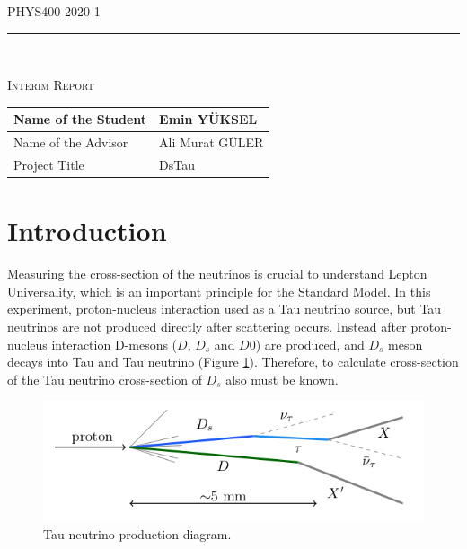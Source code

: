 \documentclass[12pt]{report}
\begin{document}
\begin{titlepage}
\centering
\vspace*{-4.0 cm}
\begin{center}    
\Large{PHYS400} \hfill \Large{2020-1}
\rule{\linewidth}{0.2 mm} \\[5.0 cm]
\end{center}
   	
\textsc{\Huge Interim Report}\\[5.0 cm]				
	
\begin{center}
\begin{tabular}{|l|l|}
\hline
\Large{Name of the Student} & Emin YÜKSEL
\\ \hline
\Large{Name of the Advisor} & Ali Murat GÜLER
\\ \hline
\Large{Project Title}       & DsTau 
\\ \hline
\end{tabular}
\end{center} 
\end{titlepage}

\tableofcontents
\pagebreak

\renewcommand{\thesection}{\arabic{section}}
\section{Introduction}

Measuring the cross-section of the neutrinos is crucial to understand Lepton Universality, which is an important principle for the Standard Model. In this experiment, proton-nucleus interaction used as a Tau neutrino source, but Tau neutrinos are not produced directly after scattering occurs. Instead after proton-nucleus interaction D-mesons ($D$, $D_s$ and $D0$) are produced, and $D_s$ meson decays into Tau and Tau neutrino (Figure \ref{fig:process}). Therefore, to calculate cross-section of the Tau neutrino cross-section of $D_s$ also must be known.~\cite{aoki_ariga_dmitrievsky_firu_forshaw_fukuda_gornushkin_guler_haiduc_2019}

\begin{figure}[htp]
\includegraphics[width=\linewidth]{dstauProcess.png}
\caption{Tau neutrino production diagram.~\cite[p.~4]{aoki_ariga_dmitrievsky_firu_forshaw_fukuda_gornushkin_guler_haiduc_2019}}
\label{fig:process}
\end{figure}
\end{document}
